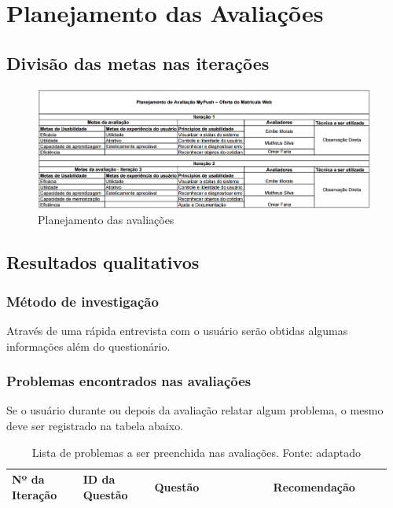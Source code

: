 \chapter{Planejamento das Avaliações}

\section{Divisão das metas nas iterações}
\begin{figure}[h!]
  \centering
    \includegraphics[keepaspectratio=true, scale=0.5]{figuras/planejamentoavaliacoes.png}
  \caption{Planejamento das avaliações}
\end{figure}

% 

\section{Resultados qualitativos}

\subsection{Método de investigação}
Através de uma rápida entrevista com o usuário serão obtidas algumas informações além do questionário.

\subsection{Problemas encontrados nas avaliações}

Se o usuário durante ou depois da avaliação relatar algum problema, o mesmo deve ser registrado na tabela abaixo.
\begin{table}[!h]
\caption{Lista de problemas a ser preenchida nas avaliações. Fonte: \cite{preece} adaptado}
\label{Rotulo}
  \begin{tabular}{p{0.18\linewidth}p{0.18\linewidth}p{0.30\linewidth}p{0.30\linewidth}}
  \hline
    Nº da Iteração & ID da Questão & Questão & Recomendação\\
 \hline
  \end{tabular}
\end{table}

